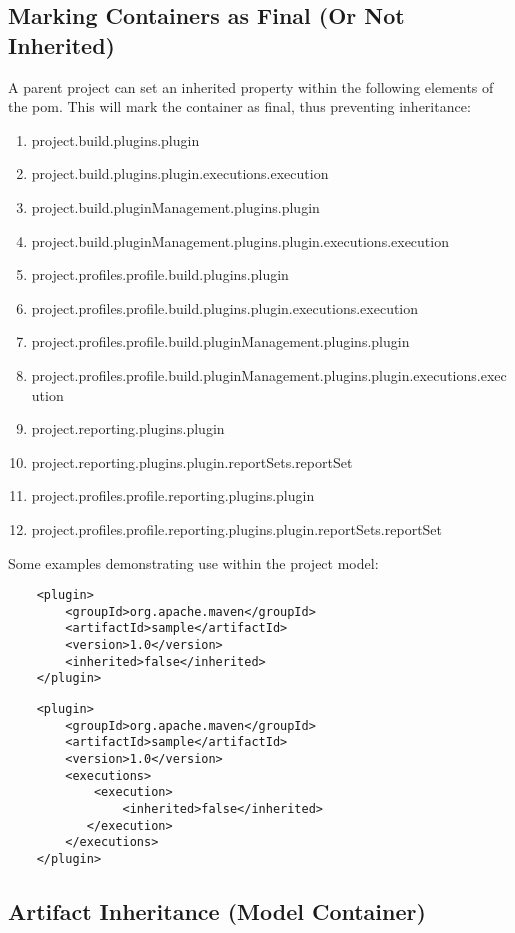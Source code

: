\documentclass[12pt]{amsart}
\begin{document}
\subsection{Marking Containers as Final (Or Not Inherited)}
A parent project can set an inherited property within the following elements of the pom. This will mark the container as final, thus preventing inheritance:
\begin{enumerate}
\item project.build.plugins.plugin
\item project.build.plugins.plugin.executions.execution
\item project.build.pluginManagement.plugins.plugin
\item project.build.pluginManagement.plugins.plugin.executions.execution
\item project.profiles.profile.build.plugins.plugin
\item project.profiles.profile.build.plugins.plugin.executions.execution
\item project.profiles.profile.build.pluginManagement.plugins.plugin
\item project.profiles.profile.build.pluginManagement.plugins.plugin.executions.execution
\item project.reporting.plugins.plugin
\item project.reporting.plugins.plugin.reportSets.reportSet
\item project.profiles.profile.reporting.plugins.plugin
\item project.profiles.profile.reporting.plugins.plugin.reportSets.reportSet
\end{enumerate}

Some examples demonstrating use within the project model:
\begin{verbatim}
    <plugin>
        <groupId>org.apache.maven</groupId>
        <artifactId>sample</artifactId>
        <version>1.0</version>
        <inherited>false</inherited>
    </plugin>
\end{verbatim}

\begin{verbatim}
    <plugin>
        <groupId>org.apache.maven</groupId>
        <artifactId>sample</artifactId>
        <version>1.0</version>
        <executions>
            <execution>
                <inherited>false</inherited>
           </execution>
        </executions>
    </plugin>
\end{verbatim}

\subsection{Artifact Inheritance (Model Container)}
\end{document}
